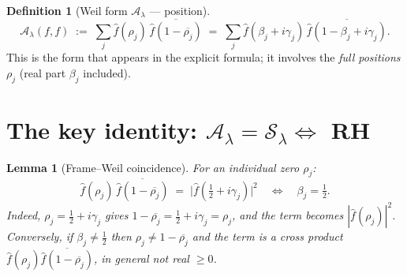 \documentclass[11pt]{article}
\theoremstyle{plain}
\newtheorem{lemma}{Lemma}
\theoremstyle{definition}
\newtheorem{definition}{Definition}
\newcommand{\half}{\tfrac12}
\newcommand{\Sframe}{\mathcal S_\lambda}
\newcommand{\Aweil}{\mathcal A_\lambda}
\begin{document}
\begin{definition}[Weil form $\Aweil$ --- position]
\[
  \Aweil(f,f)\;:=\;\sum_{j}\widehat f(\rho_j)\,\overline{\widehat f(1-\overline{\rho_j})}
  \;=\;\sum_j \widehat f(\beta_j+i\gamma_j)\,\overline{\widehat f(1-\beta_j+i\gamma_j)} .
\]
This is the form that appears in the explicit formula; it involves the \emph{full
positions} $\rho_j$ (real part $\beta_j$ included).
\end{definition}

\section{The key identity: $\Aweil=\Sframe \Leftrightarrow$ RH}\label{sec:key}

\begin{lemma}[Frame--Weil coincidence]\label{lem:coincide}
For an individual zero $\rho_j$:
\[
  \widehat f(\rho_j)\,\overline{\widehat f(1-\overline{\rho_j})}
  \;=\;\bigl|\widehat f(\half+i\gamma_j)\bigr|^2
  \quad\Longleftrightarrow\quad
  \beta_j=\half .
\]
Indeed, $\rho_j=\half+i\gamma_j$ gives $1-\overline{\rho_j}=\half+i\gamma_j=\rho_j$,
and the term becomes $|\widehat f(\rho_j)|^2$. Conversely, if
$\beta_j\ne\half$ then $\rho_j\ne1-\overline{\rho_j}$ and the term is a cross
product $\widehat f(\rho_j)\overline{\widehat f(1-\overline{\rho_j})}$, in general
\emph{not} real $\ge0$.
\end{lemma}
\end{document}
